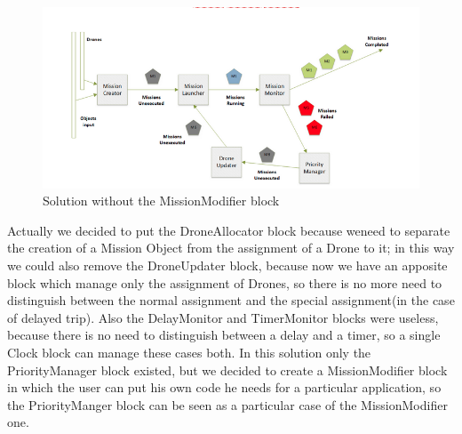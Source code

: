 \begin{figure}[H]
  \centering
  \includegraphics[width=\linewidth]{pictures/NoMM.png}
  \caption{Solution without the MissionModifier block}
  \label{fig:noMM}
\end{figure}

Actually we decided to put the DroneAllocator block because weneed to separate the creation of a Mission Object from the assignment of a Drone to it; in this way we could also remove the DroneUpdater block, because now we have an apposite block which manage only the assignment of Drones, so there is no more need to distinguish between the normal assignment and the special assignment(in the case of delayed trip).
Also the DelayMonitor and TimerMonitor blocks were useless, because there is no need to distinguish between a delay and a timer, so a single Clock block can manage these cases both.
In this solution only the PriorityManager block existed, but we decided to create a MissionModifier block in which the user can put his own code he needs for a particular application, so the PriorityManger block can be seen as a particular case of the MissionModifier one.